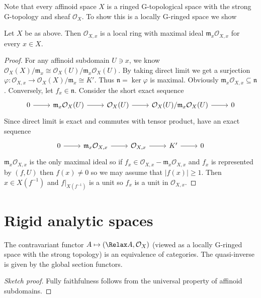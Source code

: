 \documentclass[a4paper]{article}
\newcommand{\sh}[1]{\mathcal{#1}} %
\let\Sp\Relax
\DeclareMathOperator{\Sp}{Sp} %
\begin{document}
Note that every affinoid space \(X\) is a ringed G-topological space with the strong G-topology and sheaf \(\sh O_X\). To show this is a locally G-ringed space we show

\begin{proposition}
  Let \(X\) be as above. Then \(\sh O_{X, x}\) is a local ring with maximal ideal \(\mathfrak m_x \sh O_{X, x}\) for every \(x \in X\).
\end{proposition}

\begin{proof}
  For any affinoid subdomain \(U \ni x\), we know \(\sh O_X(X)/\mathfrak m_x \cong \sh O_X(U)/\mathfrak m_x \sh O_X(U)\). By taking direct limit we get a surjection \(\varphi: \sh O_{X, x} \to \sh O_X(X)/\mathfrak m_x \cong K'\). Thus \(\mathfrak n = \ker \varphi\) is maximal. Obviously \(\mathfrak m_x \sh O_{X, x} \subseteq \mathfrak n\). Conversely, let \(f_x \in \mathfrak n\). Consider the short exact sequence
  \[
    \begin{tikzcd}
      0 \ar[r] & \mathfrak m_x \sh O_X(U) \ar[r] & \sh O_X(U) \ar[r] & \sh O_X(U)/\mathfrak m_x \sh O_X(U) \ar[r] & 0
    \end{tikzcd}
  \]
  Since direct limit is exact and commutes with tensor product, have an exact sequence
  \[
    \begin{tikzcd}
      0 \ar[r] & \mathfrak m_x \sh O_{X, x} \ar[r] & \sh O_{X, x} \ar[r] & K' \ar[r] & 0
    \end{tikzcd}
  \]
  \(\mathfrak m_x \sh O_{X, x}\) is the only maximal ideal so if \(f_x \in \sh O_{X, x} - \mathfrak m_x \sh O_{X, x}\) and \(f_x\) is represented by \((f, U)\) then \(f(x) \ne 0\) so we may assume that \(|f(x)| \geq 1\). Then \(x \in X(f^{-1})\) and \(f|_{X(f^{-1})}\) is a unit so \(f_x\) is a unit in \(\sh O_{X, x}\).
\end{proof}

\section{Rigid analytic spaces}

\begin{proposition}
  The contravariant functor \(A \mapsto (\Sp A, \sh O_X)\) (viewed as a locally G-ringed space with the strong topology) is an equivalence of categories. The quasi-inverse is given by the global section functors.
\end{proposition}

\begin{proof}[Sketch proof]
  Fully faithfulness follows from the universal property of affinoid subdomains.
\end{proof}
\end{document}
